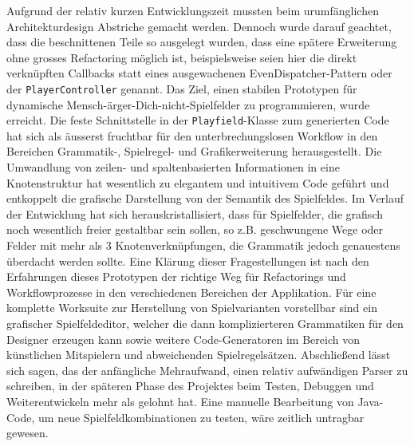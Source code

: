\documentclass[conference]{IEEEtran}
\begin{document}
Aufgrund der relativ kurzen Entwicklungszeit mussten beim urumf\"anglichen Architekturdesign Abstriche gemacht werden.
Dennoch wurde darauf geachtet, dass die beschnittenen Teile so ausgelegt wurden, dass eine sp\"atere Erweiterung
ohne grosses Refactoring m\"oglich ist, beispielsweise seien hier die direkt verkn\"upften Callbacks statt eines ausgewachenen EvenDispatcher-Pattern oder der \texttt{PlayerController} genannt. Das Ziel, einen stabilen Prototypen f\"ur dynamische Mensch-\"arger-Dich-nicht-Spielfelder zu programmieren, wurde erreicht. Die feste Schnittstelle in der \texttt{Playfield}-Klasse zum generierten Code hat sich als \"ausserst fruchtbar f\"ur den unterbrechungslosen Workflow in den Bereichen Grammatik-, Spielregel- und Grafikerweiterung herausgestellt. Die Umwandlung von zeilen- und spaltenbasierten Informationen in eine Knotenstruktur hat wesentlich zu elegantem und intuitivem Code gef\"uhrt und entkoppelt die grafische Darstellung von der Semantik des Spielfeldes. Im Verlauf der Entwicklung hat sich herauskristallisiert, dass f\"ur Spielfelder, die grafisch noch wesentlich freier gestaltbar sein sollen, so z.B. geschwungene Wege oder Felder mit mehr als 3 Knotenverkn\"upfungen, die Grammatik jedoch genauestens \"uberdacht werden sollte. Eine Kl\"arung dieser Fragestellungen ist nach den Erfahrungen dieses Prototypen der richtige Weg f\"ur Refactorings und Workflowprozesse in den verschiedenen Bereichen der Applikation. F\"ur eine komplette Worksuite zur Herstellung von Spielvarianten vorstellbar sind ein grafischer Spielfeldeditor, welcher die dann komplizierteren Grammatiken f\"ur den Designer erzeugen kann sowie weitere Code-Generatoren im Bereich von k\"unstlichen Mitspielern und abweichenden Spielregels\"atzen. Abschlie{\ss}end l\"asst sich sagen, das der anf\"angliche Mehraufwand, einen relativ aufw\"andigen Parser zu schreiben, in der sp\"ateren Phase des Projektes beim Testen, Debuggen und Weiterentwickeln mehr als gelohnt hat. Eine manuelle Bearbeitung von Java-Code, um neue Spielfeldkombinationen zu testen, w\"are zeitlich untragbar gewesen.

\end{document}
